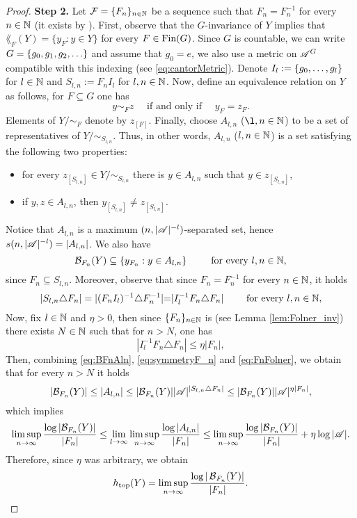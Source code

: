 \begin{proof}
\noindent
{\bf Step 2.}
Let $\operatorname{\mathcal{F}}= \{F_n\}_{n\in\mathbb{N}}$ be a \Folner sequence such that $F_n = F_n^{-1}$ for every $n\in\mathbb{N}$ (it exists by \cite{Namioka64}).
First, observe that the $G$-invariance of $Y$ implies that $\lang_{F}(Y)=\{y_{F}:y\in Y\}$ for every $F\in\operatorname{Fin}(G)$. 
Since $G$ is countable, we can write $G=\left\{g_0,g_1,g_2,\ldots\right\}$ and assume that $g_0=e$, we also use a metric on $\mathscr{A}^G$ compatible with this indexing (see \eqref{eq:cantorMetric}). Denote $I_l:=\left\{g_0,\ldots, g_l\right\}$ for $l\in\mathbb{N}$ and $S_{l,n} := F_nI_l$ for $l,n\in\mathbb{N}$. %
Now, define an equivalence relation on $Y$ as follows, for $F\subseteq G$ one has
\[
y\sim_F z \quad\text{ if and only if }\quad y_{F} = z_{F}.
\]
Elements of $Y/\sim_{F}$ denote by $z_{[F]}$. Finally, choose $A_{l,n}$ ($\l,n\in\N$) to be a set of representatives of $Y/\sim_{S_{l,n}}$. Thus, in other words, $A_{l,n}$ ($l,n\in\mathbb{N}$) is a set satisfying the following two properties:
\begin{itemize}
\item for every $z_{[S_{l,n}]}\in Y/\sim_{S_{l,n}}$ there is $y\in A_{l,n}$ such that $y\in z_{[S_{l,n}]}$,
\item if $y,z\in A_{l,n}$, then $y_{[S_{l,n}]}\neq z_{[S_{l,n}]}$.
\end{itemize}
Notice that $A_{l,n}$ is a maximum $(n,|\mathscr{A}|^{-l})$-separated set, hence $s(n,|\mathscr{A}|^{-l}) = |A_{l,n}|$. We also have 
\begin{equation}\label{eq:BFnAln}
\mathcal B_{F_n}(Y) \subseteq \left\{y_{F_n}:y\in A_{l,n}\right\} ~~~~~~\text{ for every }l,n\in\mathbb{N},
\end{equation}
since $F_n\subseteq S_{l,n}$. Moreover, observe that since $F_n=F_n^{-1}$ for every $n\in\mathbb{N}$, it holds
\begin{equation}\label{eq:symmetryF_n}
|S_{l,n}\triangle F_n| = |(F_nI_l)^{-1}\triangle F_n^{-1}| {=}|I_l^{-1}F_n\triangle F_n|~~~~~~\text{ for every }l,n\in\mathbb{N},
\end{equation}
Now, fix $l\in\mathbb{N}$ and $\eta>0$, then since $\{F_n\}_{n\in\mathbb{N}}$ is \Folner (see Lemma \ref{lem:Folner_inv}) there exists $N\in\mathbb{N}$ such that for $n>N$, one has
\begin{equation}\label{eq:FnFolner}
|I_l^{-1}F_n\triangle F_n|{\leq} \eta|F_n|,
\end{equation}
Then, combining \eqref{eq:BFnAln}, \eqref{eq:symmetryF_n} and \eqref{eq:FnFolner}, we obtain that for every $n>N$ it holds
\[
|\mathcal B_{F_n}(Y)|\leq |A_{l,n}|\leq |\mathcal B_{F_n}(Y)||\mathscr{A}|^{|S_{l,n}\triangle F_n|}\leq |\mathcal B_{F_n}(Y)||\mathscr{A}|^{\eta|F_n|},
\]
which implies
\[
\limsup_{n\to\infty}\frac{\log|\mathcal B_{F_n}(Y)|}{|F_n|}\leq\lim_{l\to\infty}\limsup_{n\to\infty} \frac{\log|A_{l,n}|}{|F_n|}\leq \limsup_{n\to\infty}\frac{\log|\mathcal B_{F_n}(Y)|}{|F_n|} + \eta\log|\mathscr{A}|.
\]
Therefore, since $\eta$ was arbitrary, we obtain
\[
h_\mathrm{top}(Y)=\limsup_{n\to\infty}\frac{\log|\operatorname{\mathcal{B}}_{F_n}(Y)|}{|F_n|}. \qedhere
\]
\end{proof}

